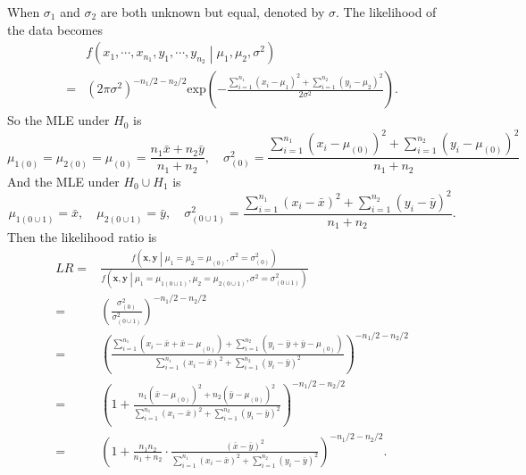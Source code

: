 \documentclass[a4paper,12pt]{article}
\begin{document}
When $\sigma_1$ and $\sigma_2$ are both unknown but equal, denoted by $\sigma$. The likelihood of the data becomes
\[
  \begin{aligned}
    & f\left(
      x_1, \cdots, x_{n_1}, y_1, \cdots, y_{n_2}
      \middle|
      \mu_1, \mu_2, \sigma^2
    \right)    \\
    = & \left(
      2\pi\sigma^2
    \right)^{-n_1 / 2 - n_2 / 2}
    \mathrm{exp}\left(
      -\frac{
        \sum\limits_{i = 1}^{n_1}\left(x_i - \mu_1\right)^2
        + \sum\limits_{i = 1}^{n_2}\left(y_i - \mu_2\right)^2
      }{
        2\sigma^2
      }
    \right)
    .
  \end{aligned}
\]
So the MLE under $H_0$ is
\[
  \mu_{1\left(0\right)} = \mu_{2\left(0\right)} = \mu_{\left(0\right)} = \frac{n_1\bar{x} + n_2\bar{y}}{n_1 + n_2}
  ,\quad
  \sigma^2_{\left(0\right)} = \frac{
    \sum\limits_{i = 1}^{n_1}\left(x_i - \mu_{\left(0\right)}\right)^2
    + \sum\limits_{i = 1}^{n_2}\left(y_i  - \mu_{\left(0\right)}\right)^2
  }{
    n_1 + n_2
  }
\]
And the MLE under $H_0\cup H_1$ is
\[
  \mu_{1\left(0\cup1\right)} = \bar{x},\quad \mu_{2\left(0\cup1\right)} = \bar{y}
  ,\quad
  \sigma^2_{\left(0\cup1\right)} =
  \frac{
    \sum\limits_{i = 1}^{n_1}\left(x_i - \bar{x}\right)^2
    + \sum\limits_{i = 1}^{n_2}\left(y_i - \bar{y}\right)^2
  }{
    n_1 + n_2
  }
  .
\]
Then the likelihood ratio is
\[
  \begin{aligned}
    LR =& \frac{
      f\left(\bm{x}, \bm{y}\middle|\mu_1 = \mu_2 = \mu_{\left(0\right)}, \sigma^2 = \sigma_{\left(0\right)}^2\right)
    }{
      f\left(\bm{x}, \bm{y}\middle|
        \mu_1 = \mu_{1\left(0\cup1\right)},
        \mu_2 = \mu_{2\left(0\cup1\right)},
        \sigma^2 = \sigma_{\left(0\cup1\right)}^2\right)
    }    \\
    =& \left(
      \frac{\sigma_{\left(0\right)}^2}{\sigma_{\left(0\cup1\right)}^2}
    \right)^{-n_1 / 2 - n_2 / 2}    \\
    =& \left(
      \frac{
        \sum\limits_{i = 1}^{n_1}\left(x_i - \bar{x} + \bar{x} - \mu_{\left(0\right)}\right)
        + \sum\limits_{i = 1}^{n_2}\left(y_i - \bar{y} + \bar{y} - \mu_{\left(0\right)}\right)
      }{
        \sum\limits_{i = 1}^{n_1}\left(x_i - \bar{x}\right)^2
        + \sum\limits_{i = 1}^{n_2}\left(y_i - \bar{y}\right)^2
      }
    \right)^{-n_1 / 2 - n_2 / 2}    \\
    =& \left(
      1 + \frac{
        n_1\left(\bar{x} - \mu_{\left(0\right)}\right)^2
        + n_2\left(\bar{y} - \mu_{\left(0\right)}\right)^2
      }{
        \sum\limits_{i = 1}^{n_1}\left(x_i - \bar{x}\right)^2
        + \sum\limits_{i = 1}^{n_2}\left(y_i - \bar{y}\right)^2
      }
    \right)^{-n_1 / 2 - n_2 / 2}    \\
    =& \left(
      1 + \frac{n_1n_2}{n_1 + n_2}
      \cdot
      \frac{\left(\bar{x} - \bar{y}\right)^2}{
        \sum\limits_{i = 1}^{n_1}\left(x_i - \bar{x}\right)^2
        + \sum\limits_{i = 1}^{n_2}\left(y_i - \bar{y}\right)^2       
      }
    \right)^{-n_1 / 2 - n_2 / 2}
    .
  \end{aligned}
\]
\end{document}
